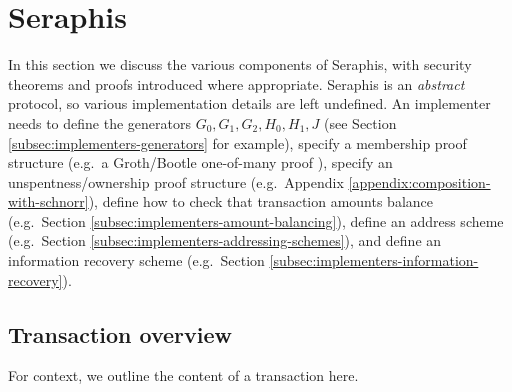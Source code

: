 \section{Seraphis}
\label{sec:seraphis}

In this section we discuss the various components of Seraphis, with security theorems and proofs introduced where appropriate. Seraphis is an {\em abstract} protocol, so various implementation details are left undefined. An implementer needs to define the generators $G_0, G_1, G_2, H_0, H_1, J$ (see Section \ref{subsec:implementers-generators} for example), specify a membership proof structure (e.g.\ a Groth/Bootle one-of-many proof \cite{bootle-one-of-many, triptych-preprint, lelantus-spark}), specify an unspentness/ownership proof structure (e.g.\ Appendix \ref{appendix:composition-with-schnorr}), define how to check that transaction amounts balance (e.g.\ Section \ref{subsec:implementers-amount-balancing}), define an address scheme (e.g.\ Section \ref{subsec:implementers-addressing-schemes}), and define an information recovery scheme (e.g.\ Section \ref{subsec:implementers-information-recovery}).


\subsection{Transaction overview}
\label{subsec:seraphis-transaction-overview}

For context, we outline the content of a transaction here.

